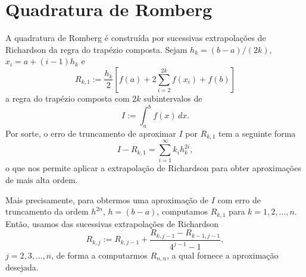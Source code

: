 \section{Quadratura de Romberg}\label{cap_integr_sec_Romberg}

A quadratura de Romberg é construída por sucessivas extrapolações de Richardson da regra do trapézio composta. Sejam $h_k = (b-a)/(2k)$, $x_i = a + (i-1)h_k$ e
\begin{equation}
  R_{k,1} := \frac{h_k}{2}\left[f(a) + 2\sum_{i=2}^{2k}f(x_i) + f(b)\right]
\end{equation}
a regra do trapézio composta com $2k$ subintervalos de
\begin{equation}
  I := \int_a^b f(x)\,dx.
\end{equation}
Por sorte, o erro de truncamento de aproximar $I$ por $R_{k,1}$ tem a seguinte forma
\begin{equation}
  I - R_{k,1} = \sum_{i=1}^\infty k_ih_k^{2i},
\end{equation}
o que nos permite aplicar a extrapolação de Richardson para obter aproximações de mais alta ordem.

Mais precisamente, para obtermos uma aproximação de $I$ com erro de truncamento da ordem $h^{2n}$, $h=(b-a)$, computamos $R_{k,1}$ para $k=1, 2, \dotsc, n$. Então, usamos das sucessivas extrapolações de Richardson
\begin{equation}
  R_{k,j} := R_{k,j-1} + \frac{R_{k,j-1}-R_{k-1,j-1}}{4^{j-1}-1},
\end{equation}
$j=2, 3, \dotsc, n$, de forma a computarmos $R_{n,n}$, a qual fornece a aproximação desejada.

